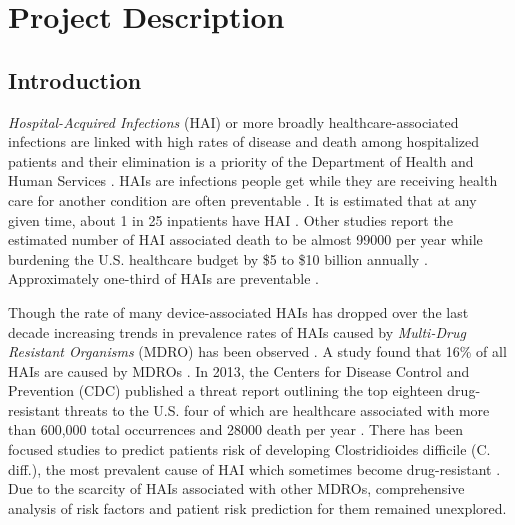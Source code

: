 \section{Project Description}
\subsection{Introduction}
\emph{Hospital-Acquired Infections} (HAI) or more broadly healthcare-associated infections are linked with high rates of disease and death among hospitalized patients \cite{cdc} and their elimination is a priority of the Department of Health and Human Services \cite{hhs}. HAIs are infections people get while they are receiving health care for another condition are often preventable \cite{progress}. It is estimated that at any given time, about 1 in 25 inpatients have HAI \cite{magill2014multistate, hhs}. Other studies report the estimated number of HAI associated death to be almost 99000 per year \cite{klevens2007estimating} while burdening the U.S. healthcare budget by \$5 to \$10 billion annually \cite{stone2005economic}. Approximately one-third of HAIs are preventable \cite{yokoe2014compendium}.   



Though the rate of many device-associated HAIs has dropped over the last decade \cite{progress} increasing trends in prevalence rates of HAIs caused by \emph{Multi-Drug Resistant Organisms} (MDRO) has been observed \cite{balkhair2014epidemiology, actionplan}. A study found that 16\% of all HAIs are caused by MDROs \cite{hidron2008antimicrobial}. In 2013, the Centers for Disease Control and Prevention (CDC) published a threat report outlining the top eighteen drug-resistant threats to the U.S. four of which are healthcare associated with more than 600,000 total occurrences and 28000 death per year \cite{resistance}. There has been focused studies to predict patients risk of developing Clostridioides difficile (C. diff.), the most prevalent cause of HAI which sometimes become drug-resistant \cite{oh2018generalizable, wiens2012learning, wiens2014learning, wiens2012patient}. Due to the scarcity of HAIs associated with other MDROs, comprehensive analysis of risk factors and patient risk prediction for them remained unexplored. 



